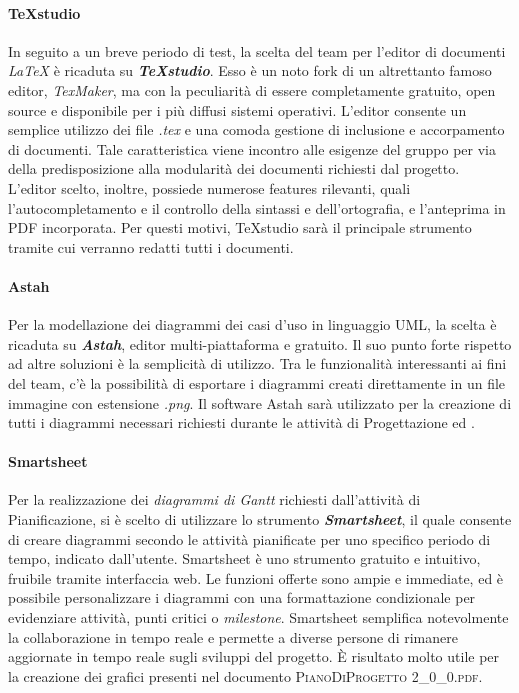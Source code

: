 	\paragraph{TeXstudio}
		In seguito a un breve periodo di test, la scelta del team per l'editor di documenti \textit{\LaTeX{}} è ricaduta su \textit{\textbf{TeXstudio}}. Esso è un noto fork di un altrettanto famoso editor, \textit{TexMaker}, ma con la peculiarità di essere completamente gratuito, open source e disponibile per i più diffusi sistemi operativi. L'editor consente un semplice utilizzo dei file \textit{.tex} e una comoda gestione di inclusione e accorpamento di documenti. Tale caratteristica viene incontro alle esigenze del gruppo per via della predisposizione alla modularità dei documenti richiesti dal progetto. L'editor scelto, inoltre, possiede numerose features rilevanti, quali l'autocompletamento e il controllo della sintassi e dell'ortografia, e l'anteprima in PDF incorporata. Per questi motivi, TeXstudio sarà il principale strumento tramite cui verranno redatti tutti i documenti.
	
		\paragraph{Astah}
		Per la modellazione dei diagrammi dei casi d'uso in linguaggio UML, la scelta è ricaduta su \textit{\textbf{Astah}}, editor multi-piattaforma e gratuito. Il suo punto forte rispetto ad altre soluzioni è la semplicità di utilizzo. Tra le funzionalità interessanti ai fini del team, c'è la possibilità di esportare i diagrammi creati direttamente in un file immagine con estensione \textit{.png}. Il software Astah sarà utilizzato per la creazione di tutti i diagrammi necessari richiesti durante le attività di Progettazione ed \AdR.
		
		\paragraph{Smartsheet}
		Per la realizzazione dei \textit{diagrammi di Gantt} richiesti dall'attività di Pianificazione, si è scelto di utilizzare lo strumento \textit{\textbf{Smartsheet}}, il quale consente di creare diagrammi secondo le attività pianificate per uno specifico periodo di tempo, indicato dall'utente.
		Smartsheet è uno strumento gratuito e intuitivo, fruibile tramite interfaccia web. Le funzioni offerte sono ampie e immediate, ed è possibile personalizzare i diagrammi con una formattazione condizionale per evidenziare attività, punti critici o \textit{milestone}. Smartsheet semplifica notevolmente la collaborazione in tempo reale e permette a diverse persone di rimanere aggiornate in tempo reale sugli sviluppi del progetto. \MakeUppercase{è} risultato molto utile per la creazione dei grafici presenti nel documento \textsc{PianoDiProgetto 2\_0\_0.pdf}.
		

